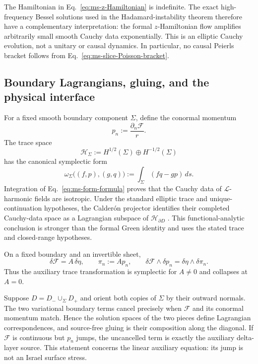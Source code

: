 The Hamiltonian in Eq.~\eqref{eq:ms-z-Hamiltonian} is indefinite. The exact
high-frequency Bessel solutions used in the Hadamard-instability theorem
therefore have a complementary interpretation: the formal $z$-Hamiltonian
flow amplifies arbitrarily small smooth Cauchy data exponentially. This is
an elliptic Cauchy evolution, not a unitary or causal dynamics. In
particular, no causal Peierls bracket follows from
Eq.~\eqref{eq:ms-slice-Poisson-bracket}.

\subsection{Boundary Lagrangians, gluing, and the physical interface}

For a fixed smooth boundary component $\Sigma$, define the conormal momentum
\begin{equation}
p_n:=\frac{\partial_n\mathcal F}{r}.
\label{eq:ms-conormal-momentum}
\end{equation}
The trace space
\begin{equation}
\mathcal H_\Sigma
:=H^{1/2}(\Sigma)\oplus H^{-1/2}(\Sigma)
\label{eq:ms-boundary-space}
\end{equation}
has the canonical symplectic form
\begin{equation}
\omega_\Sigma\bigl((f,p),(g,q)\bigr)
:=\int_\Sigma(fq-gp)\,ds.
\label{eq:ms-boundary-symplectic-form}
\end{equation}
Integration of Eq.~\eqref{eq:ms-form-formula} proves that the Cauchy data of
$\mathcal L$-harmonic fields are isotropic. Under the standard elliptic trace
and unique-continuation hypotheses, the Calder\'on projector identifies
their completed Cauchy-data space as a Lagrangian subspace of
$\mathcal H_{\partial D}$
\cite{BoossBavnbekLeschZhu2009JGP,CoxEtAl2016TAMS}. This functional-analytic
conclusion is stronger than the formal Green identity and uses the stated
trace and closed-range hypotheses.

On a fixed boundary and an invertible sheet,
\begin{equation}
\delta\mathcal F=A\,\delta\eta,
\qquad
\pi_n:=A p_n,
\qquad
\delta\mathcal F\wedge\delta p_n
=\delta\eta\wedge\delta\pi_n.
\label{eq:ms-boundary-canonical-map}
\end{equation}
Thus the auxiliary trace transformation is symplectic for $A\neq0$ and
collapses at $A=0$.

Suppose $D=D_-\cup_\Sigma D_+$ and orient both copies of $\Sigma$ by their
outward normals. The two variational boundary terms cancel precisely when
$\mathcal F$ and its conormal momentum match. Hence the solution spaces of
the two pieces define Lagrangian correspondences, and source-free gluing is
their composition along the diagonal. If $\mathcal F$ is continuous but
$p_n$ jumps, the uncancelled term is exactly the auxiliary delta-layer
source. This statement concerns the linear auxiliary equation: its jump is
not an Israel surface stress.

